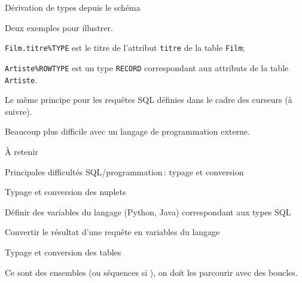 \begin{frame}[fragile]{Dérivation de types depuis le schéma}

Deux exemples pour illustrer.

\vfill

\begin{redbullet}

  \item \texttt{Film.titre\%TYPE} est le titre de l'attribut
     \texttt{titre} de la table \texttt{Film};

  \item \texttt{Artiste\%ROWTYPE} est  un type \texttt{RECORD} 
      correspondant aux attributs de la table \texttt{Artiste}.
\end{redbullet}

\vfill

Le même principe pour les \alert{requêtes SQL} définies dans le cadre des curseurs (à suivre).

\vfill

\alert{Beaucoup plus difficile avec un langage de programmation externe.}

\end{frame}

\begin{frame}{À retenir}


Principales difficultés SQL/programmation\,:
\alert{typage} et \alert{conversion}

\vfill

\alert{Typage et conversion des nuplets}

\vfill

\begin{redbullet}
   \item Définir des variables du langage (Python, Java) correspondant aux types
       SQL
   \item Convertir le résultat d'une requête en variables du langage
\end{redbullet}

\vfill

\alert{Typage et conversion des tables}

\vfill

\begin{blocgauche}
Ce sont des \alert{ensembles} (ou séquences si ), on doit les parcourir avec des \alert{boucles}.
\end{blocgauche}
\end{frame}




